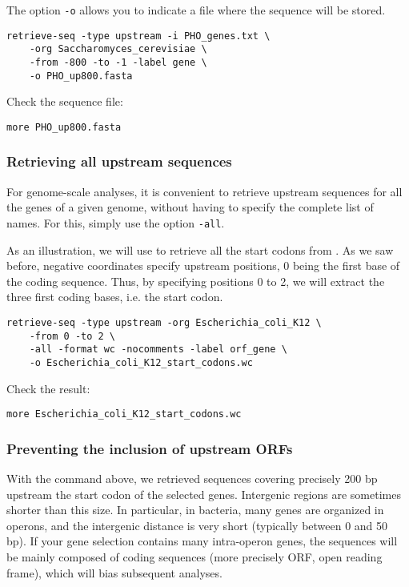 The option \texttt{-o} allows you to indicate a file where the
sequence will be stored.

\begin{verbatim}
retrieve-seq -type upstream -i PHO_genes.txt \
    -org Saccharomyces_cerevisiae \
    -from -800 -to -1 -label gene \
    -o PHO_up800.fasta
\end{verbatim} 

Check the sequence file:

\begin{verbatim}
more PHO_up800.fasta
\end{verbatim}

\subsubsection{Retrieving all upstream sequences}

For genome-scale analyses, it is convenient to retrieve upstream
sequences for all the genes of a given genome, without having to
specify the complete list of names. For this, simply use the option
\texttt{-all}.

As an illustration, we will use \command{retrieve-seq} to retrieve all
the start codons from . As we saw before,
negative coordinates specify upstream positions, 0 being the first
base of the coding sequence. Thus, by specifying positions 0 to 2, we
will extract the three first coding bases, i.e. the start codon. 

\begin{verbatim}
retrieve-seq -type upstream -org Escherichia_coli_K12 \
    -from 0 -to 2 \
    -all -format wc -nocomments -label orf_gene \
    -o Escherichia_coli_K12_start_codons.wc
\end{verbatim}

Check the result:

\begin{verbatim}
more Escherichia_coli_K12_start_codons.wc
\end{verbatim}

\subsubsection{Preventing the inclusion of upstream ORFs}

With the command above, we retrieved sequences covering precisely 200
bp upstream the start codon of the selected genes. Intergenic regions
are sometimes shorter than this size. In particular, in bacteria, many
genes are organized in operons, and the intergenic distance is very
short (typically between 0 and 50 bp). If your gene selection contains
many intra-operon genes, the sequences will be mainly composed of
coding sequences (more precisely ORF, open reading frame), which will
bias subsequent analyses.


